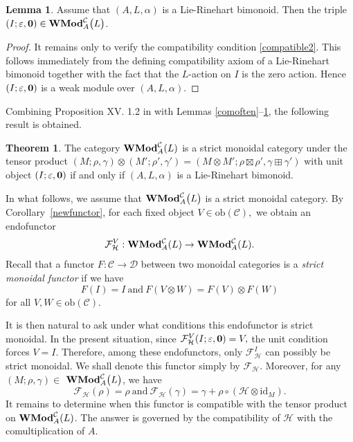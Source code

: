 \documentclass[11pt]{amsart}
\newcommand{\calC}{\mathcal{C}}
\newcommand{\ob}{\mathrm{ob}}
\newcommand{\id}{\mathrm{id}}
\theoremstyle{definition}
\newtheorem{lem}[theo]{Lemma}
\newtheorem{theor}[theo]{Theorem}
\numberwithin{equation}{section}
\begin{document}
\begin{lem}\label{comofunit}
Assume that $(A,L,\alpha)$ is a Lie-Rinehart bimonoid. Then the triple  $(I;\varepsilon, \textbf{0}) \in {\bf WMod}^{\calC}_A{\big(L\big)}$.
\end{lem}
\begin{proof}
It remains only to verify the compatibility condition \eqref{compatible2}.
This follows immediately from the defining compatibility axiom of a
Lie-Rinehart bimonoid together with the fact that the $L$-action on $I$ is the zero action. Hence $(I;\varepsilon,{\bf 0})$ is a weak module over $(A,L,\alpha)$.
\end{proof}
Combining Proposition XV. 1.2 in \cite{Kas95} with Lemmas \ref{comoften}--\ref{comofunit}, the following result is obtained. 
\begin{theor}
The category ${\bf WMod}^{\mathcal C}_A(L)$ is a strict monoidal category under the tensor product
$(M;\rho,\gamma)\otimes (M';\rho',\gamma')
=
(M\otimes M';\rho\boxtimes \rho',\gamma\boxplus \gamma')$
with unit object $(I;\varepsilon,{\bf 0})$ if and only if $(A,L,\alpha)$ is a Lie-Rinehart bimonoid.
\end{theor}
		
In what follows, we assume that ${\bf WMod}^{\calC}_A{\big(L\big)}$ is a strict monoidal category. By Corollary~\ref{newfunctor}, for each fixed
object $V\in \mathrm{ob}(\mathcal C),$
we obtain an endofunctor
\[
\mathcal F_{\mathcal H}^{V}:
{\bf WMod}^{\mathcal C}_A(L)
\rightarrow
{\bf WMod}^{\mathcal C}_A(L).
\]
Recall that a functor $F:\calC \to \mathcal{D}$ between two monoidal categories is a \emph{strict monoidal functor} if we have 
\[F(I)=I \ \mathrm{and} \ F(V\otimes W)=F(V)\otimes F(W)  \]
for all $V,W\in \ob(\calC)$.

It is then natural to ask under what conditions this endofunctor is strict monoidal.		
In the present situation, since
$\mathcal F_{\mathcal H}^{V}(I;\varepsilon,{\bf 0})=V,$
the unit condition forces $V=I$. Therefore, among these endofunctors, only $\mathcal F_{\mathcal H}^{I}$
can possibly be strict monoidal. We shall denote this functor simply by $\mathcal F_{\mathcal H}.$ Moreover, for any $(M;\rho,\gamma)\in$ ${\bf WMod}^{\calC}_A{\big(L\big)}$,  we have 
\[ \mathcal{F}_{\mathcal{H}}(\rho)=\rho \ \mathrm{and} \  \mathcal{F}_{\mathcal{H}}(\gamma)=\gamma+\rho\circ (\mathcal{H}\otimes \id_M).\] It remains to determine when this functor is compatible with the tensor
product on ${\bf WMod}^{\mathcal C}_A(L)$. The answer is governed by the compatibility of $\mathcal H$ with the comultiplication of $A$. 
		
\end{document}
